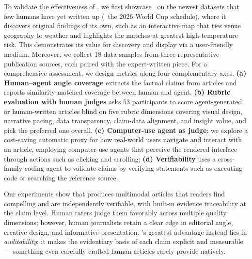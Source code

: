 To validate the effectiveness of \method, we first showcase \methodshort\ on the newest datasets that few humans have yet written up (\eg~the 2026 World Cup schedule), where it discovers original findings of its own, such as an interactive map that ties venue geography to weather and highlights the matches at greatest high-temperature risk. This demonstrates its value for discovery and display via a user-friendly medium.
Moreover, we collect 18 data samples from three representative publication sources, each paired with the  expert-written piece.
For a comprehensive assessment, we design metrics along four complementary axes. 
\textbf{(a) Human--agent angle coverage} extracts the factual claims from articles and reports similarity-matched coverage between human and agent.
\textbf{(b) Rubric evaluation with human judges} asks 53 participants to score agent-generated or human-written articles blind on five rubric dimensions covering visual design, narrative pacing, data transparency, claim-data alignment, and insight value, and pick the preferred one overall. 
\textbf{(c) Computer-use agent as judge}:
we explore a cost-saving automatic proxy for how real-world users navigate and interact with an article, employing computer-use agents that perceive the rendered interface through actions such as clicking and scrolling;
\textbf{(d) Verifiability} uses a cross-family coding agent to validate claims by verifying statements such as executing code or searching the reference source.

Our experiments show that \methodshort{} produces multimodal articles that readers find compelling and are independently verifiable, with built-in evidence traceability at the claim level.
Human raters judge them favorably across multiple quality dimensions;
however, human journalists retain a clear edge in editorial angle, creative design, and informative presentation.
\methodshort{}'s greatest advantage instead lies in \textit{auditability}: it makes the evidentiary basis of each claim explicit and measurable — something even carefully crafted human articles rarely provide natively. 

